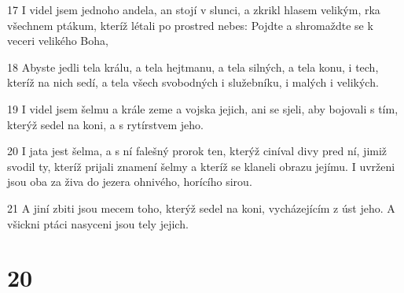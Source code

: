 \par 17 I videl jsem jednoho andela, an stojí v slunci, a zkrikl hlasem velikým, rka všechnem ptákum, kteríž létali po prostred nebes: Pojdte a shromaždte se k veceri velikého Boha,
\par 18 Abyste jedli tela králu, a tela hejtmanu, a tela silných, a tela konu, i tech, kteríž na nich sedí, a tela všech svobodných i služebníku, i malých i velikých.
\par 19 I videl jsem šelmu a krále zeme a vojska jejich, ani se sjeli, aby bojovali s tím, kterýž sedel na koni, a s rytírstvem jeho.
\par 20 I jata jest šelma, a s ní falešný prorok ten, kterýž ciníval divy pred ní, jimiž svodil ty, kteríž prijali znamení šelmy a kteríž se klaneli obrazu jejímu. I uvrženi jsou oba za živa do jezera ohnivého, horícího sirou.
\par 21 A jiní zbiti jsou mecem toho, kterýž sedel na koni, vycházejícím z úst jeho. A všickni ptáci nasyceni jsou tely jejich.

\chapter{20}

